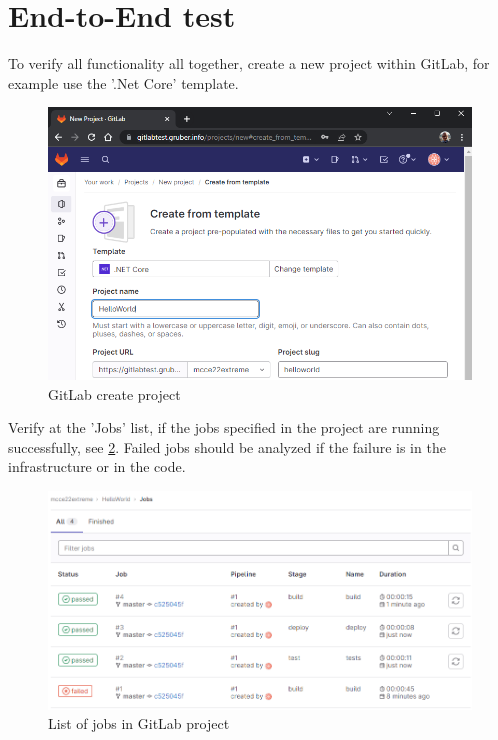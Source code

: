 \section{End-to-End test}

To verify all functionality all together, create a new project within GitLab, for example use the '.Net Core' template.
\begin{figure}[H]
	\centering
	\includegraphics[width=14cm]{images/gitlab_create_project.png}
	\caption{GitLab create project}
	\label{fig:gitlab_create_project}
\end{figure}

Verify at the 'Jobs' list, if the jobs specified in the project are running successfully, see \ref{fig:gitlab_jobs_list}.
Failed jobs should be analyzed if the failure is in the infrastructure or in the code.
\begin{figure}[H]
	\centering
	\includegraphics[width=14cm]{images/gitlab_jobs_list.png}
	\caption{List of jobs in GitLab project}
	\label{fig:gitlab_jobs_list}
\end{figure}